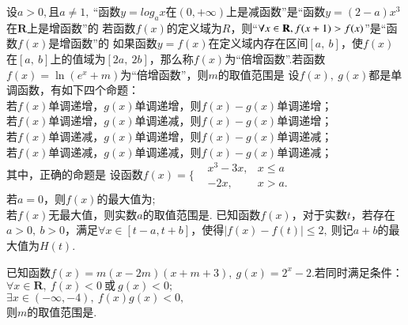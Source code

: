 \documentclass{BHCexam}
\begin{document}
\begin{questions}
\qs 设$ a>0, $且$ a\ne 1,~ $“函数$y=log_ax$在$ \left(0,+\infty\right) $上是减函数”是“函数$ y=(2-a)x^3 $在$ \mathbf{R} $上是增函数”的\xx
{}
\qs 若函数$f(x)$的定义域为$ R $，则“$ \forall x\in\mathbf{R},f(x+1)>f(x) $”是“函数$ f(x) $是增函数”的\xx
{}
\qs 如果函数$y=f(x)$在定义域内存在区间$ \left[a,~b\right] $，使$f(x)$在$ \left[a,~b\right] $上的值域为$ \left[2a,~2b\right] $，那么称$f(x)$为“倍增函数”.若函数$ f(x)=\ln (e^x+m) $为“倍增函数”，则$ m $的取值范围是\xx
{}
\qs 设$f(x),\ g(x)$都是单调函数，有如下四个命题：\\
若$f(x)$单调递增，$g(x)$单调递增，则$f(x)-g(x)$单调递增；\\
若$f(x)$单调递增，$g(x)$单调递减，则$f(x)-g(x)$单调递增；\\
若$f(x)$单调递减，$g(x)$单调递增，则$f(x)-g(x)$单调递减；\\
若$f(x)$单调递减，$g(x)$单调递减，则$f(x)-g(x)$单调递减；\\
其中，正确的命题是\xx
{}
\qs 设函数$f(x)=\Bigg\{\begin{aligned}
&x^3-3x,&x\le a \\
&-2x,&x>a.
\end{aligned}$\\
 若$ a=0 $，则$f(x)$的最大值为\tk;\\
 若$f(x)$无最大值，则实数$ a $的取值范围是\tk.
\qs 已知函数$f(x)$，对于实数$ t $，若存在$ a>0,~b>0$，满足$ \forall x\in [t-a,t+b] $，使得$ \left|f(x)-f(t)\right|\le 2,~ $则记$ a+b $的最大值为$ H(t) .$
\qs 已知函数$f(x)=m(x-2m)(x+m+3),~g(x)=2^x-2.$若同时满足条件：\\
 $ \forall x \in \mathbf{R} ,~f(x)<0~\text{或}~g(x)<0;$\\
 $ \exists x \in (-\infty,-4),~f(x)g(x)<0, $\\
则$ m $的取值范围是\tk.
\end{questions}
\newpage
\end{document}
